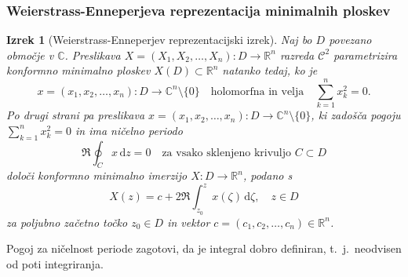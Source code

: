 \documentclass[8pt]{beamer}
\theoremstyle{definition}
\theoremstyle{remark}
\theoremstyle{plain}
\newtheorem{izrek}[definicija]{Izrek}
\numberwithin{equation}{section}  %
\begin{document}
\begin{frame}
    \frametitle{Weierstrass-Enneperjeva reprezentacija minimalnih ploskev}

    \begin{izrek}[Weierstrass-Enneperjev reprezentacijski izrek]
        Naj bo $D$ povezano območje v $\mathbb{C}$. Preslikava $X=\left(X_1, X_2, \ldots, X_n\right): D \rightarrow \mathbb{R}^n$ razreda $\mathscr{C}^2$ parametrizira konformno minimalno ploskev $X(D) \subset \mathbb{R}^n$ natanko tedaj, ko je
        \begin{equation*}
            x=\left(x_1, x_2, \ldots, x_n\right): D \rightarrow \mathbb{C}^n \setminus \{0\} \quad \text{holomorfna in velja} \quad  \sum_{k=1}^n x_k^2=0.
        \end{equation*}
        Po drugi strani pa preslikava $x=\left(x_1, x_2, \ldots, x_n\right): D \rightarrow \mathbb{C}^n \setminus\{0\}$, ki zadošča pogoju $\sum_{k=1}^nx_k^2=0$ in ima ničelno periodo
        \begin{equation*}
            \Re \oint_C x \, \mathrm{d} z=0 \quad \text{za vsako sklenjeno krivuljo } C \subset D
        \end{equation*}
        določi konformno minimalno imerzijo $X: D \rightarrow \mathbb{R}^n$, podano s 
        \begin{equation*}
            X(z)=c+2 \Re \int_{z_0}^z x(\zeta) \, \mathrm{d} \zeta, \quad z \in D
        \end{equation*}
        za poljubno začetno točko $z_0 \in D$ in vektor $c=\left(c_1, c_2, \ldots, c_n\right) \in \mathbb{R}^n$.
    \end{izrek}
    Pogoj za ničelnost periode zagotovi, da je integral dobro definiran, t.~j.~neodvisen od poti integriranja.
    
\end{frame}
\end{document}
